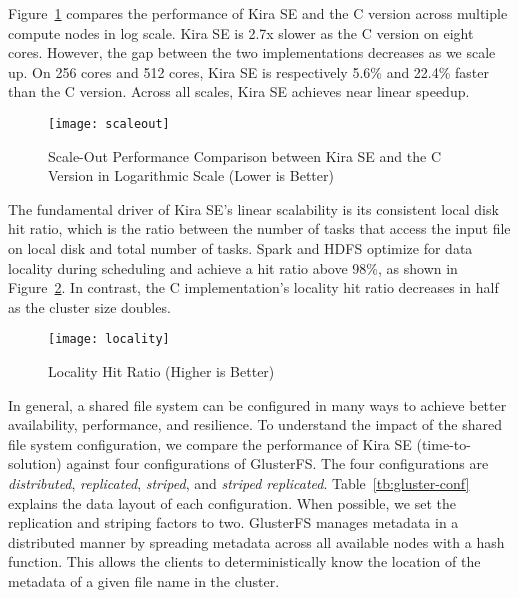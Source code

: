 \documentclass[conference]{IEEEtran}
\begin{document}
Figure~\ref{fig:scaleout} compares the performance of Kira SE and the C version across
multiple compute nodes in log scale. Kira SE is 2.7x slower as the C version
on eight cores. However, the gap between the two implementations decreases as we scale up. 
On 256 cores and 512 cores, Kira SE is respectively 5.6\% and 22.4\% faster than the C version.
Across all scales, Kira SE achieves near linear speedup.

\begin{figure}[h]
	\begin{center}
		\texttt{[image: scaleout]}
		\caption{Scale-Out Performance Comparison between Kira SE and the C Version in Logarithmic Scale (Lower is Better)
		\label{fig:scaleout}}
  	\end{center}
\end{figure}

The fundamental driver of Kira SE's linear scalability is its consistent local disk
hit ratio, which is the ratio between the number of tasks that access the input file 
on local disk and total number of tasks. Spark and HDFS optimize for data locality during scheduling and achieve a
hit ratio above 98\%, as shown in Figure~\ref{fig:locality}. In contrast, the
C implementation's locality hit ratio decreases in half as the cluster size doubles.

\begin{figure}[h]
	\begin{center}
		\texttt{[image: locality]}
		\caption{Locality Hit Ratio (Higher is Better)
		\label{fig:locality}}
  	\end{center}
\end{figure}

In general, a shared file system can be configured in many ways to achieve better
availability, performance, and resilience. To understand the impact of the shared
file system configuration, we compare the performance of Kira SE (time-to-solution)
against four configurations of GlusterFS. The four configurations are
\emph{distributed}, \emph{replicated}, \emph{striped}, and \emph{striped replicated}. 
Table~\ref{tb:gluster-conf} explains the data layout of each configuration.
When possible, we set the replication and striping factors to two.
GlusterFS manages metadata in a distributed manner by spreading metadata across
all available nodes with a hash function. This allows the clients to deterministically
know the location of the metadata of a given file name in the cluster.
\end{document}
